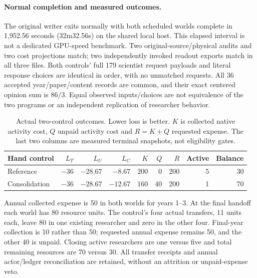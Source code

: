 \paragraph{Normal completion and measured outcomes.}
The original writer exits normally with both scheduled worlds complete in
1,952.56 seconds (32m32.56s) on the shared local host. This elapsed interval is
not a dedicated GPU-speed benchmark. Two original-source/physical audits and
two cost projections match; two independently invoked readout exports match
in all three files. Both controls' full 179 scientist request payloads and
literal response choices are identical in order, with no unmatched requests.
All 36 accepted year/paper/content records are common, and their exact centered
opinion sum is $86/3$. Equal observed inputs/choices are not equivalence of
the two programs or an independent replication of researcher behavior.

\begin{table}[t]
\centering\small
\caption{Actual two-control outcomes. Lower loss is better. $K$ is collected
native activity cost, $Q$ unpaid activity cost and $R=K+Q$ requested expense.
The last two columns are measured terminal snapshots, not eligibility gates.}
\label{tab:native-terminal-cost}
\setlength{\tabcolsep}{4pt}
\begin{tabular}{lrrrrrrrr}
\toprule
Hand control & $L_T$ & $L_U$ & $L_C$ & $K$ & $Q$ & $R$ & Active & Balance\\
\midrule
Reference & $-36$ & $-28.67$ & $-8.67$ & 200 & 0 & 200 & 5 & 30\\
Consolidation & $-36$ & $-28.67$ & $-12.67$ & 160 & 40 & 200 & 1 & 70\\
\bottomrule
\end{tabular}
\end{table}

Annual collected expense is 50 in both worlds for years 1--3. At the final
handoff each world has 80 resource units. The control's four actual transfers,
11 units each, leave 80 in one existing researcher and zero in the other four.
Final-year collection is 10 rather than 50; requested annual expense remains
50, and the other 40 is unpaid. Closing active researchers are one versus five
and total remaining resources are 70 versus 30. All transfer receipts and
annual actor/ledger reconciliation are retained, without an attrition or
unpaid-expense veto.

